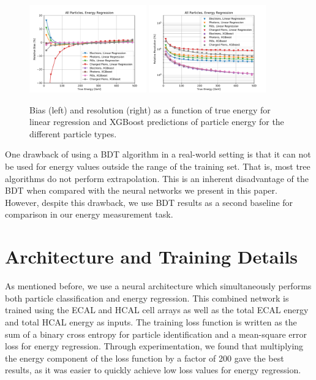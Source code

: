 \begin{figure}[htbp]
\centering
\includegraphics[width=0.45\textwidth]{Images/Calo/bias_vs_E_allparts_linreg_xgb.pdf}
\includegraphics[width=0.45\textwidth]{Images/Calo/res_vs_E_allparts_linreg_xgb_fits.pdf}
\caption{Bias (left) and resolution (right) as a function of true energy for linear regression and XGBoost  predictions of particle energy for the different particle types.\label{fig:reg_xgb_linreg}}
\end{figure}

One drawback of using a BDT algorithm in a real-world setting is that it can not be used for energy values outside the range of the training set. That is, most tree algorithms do not perform extrapolation. This is an inherent disadvantage of the BDT when compared with the neural networks we present in this paper. However, despite this drawback, we use BDT results as a second baseline for comparison in our energy measurement task.

\section{Architecture and Training Details}

As mentioned before, we use a neural architecture which simultaneously performs both particle classification and energy regression. This combined network is trained using the ECAL and HCAL cell arrays as well as the total ECAL energy and total HCAL energy as inputs. The training loss function is written as the sum of a binary cross entropy for particle identification and a mean-square error loss for energy regression. Through experimentation, we found that multiplying the energy component of the loss function by a factor of 200 gave the best results, as it was easier to quickly achieve low loss values for energy regression.

